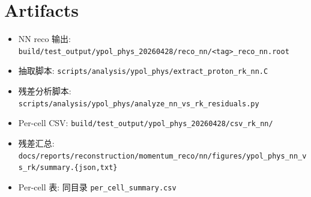 \documentclass[a4paper,11pt]{article}
\begin{document}
\section*{Artifacts}
\begin{itemize}[nosep]
    \item NN reco 输出: \texttt{build/test\_output/ypol\_phys\_20260428/reco\_nn/<tag>\_reco\_nn.root}
    \item 抽取脚本: \texttt{scripts/analysis/ypol\_phys/extract\_proton\_rk\_nn.C}
    \item 残差分析脚本: \texttt{scripts/analysis/ypol\_phys/analyze\_nn\_vs\_rk\_residuals.py}
    \item Per-cell CSV: \texttt{build/test\_output/ypol\_phys\_20260428/csv\_rk\_nn/}
    \item 残差汇总: \texttt{docs/reports/reconstruction/momentum\_reco/nn/figures/ypol\_phys\_nn\_vs\_rk/summary.\{json,txt\}}
    \item Per-cell 表: 同目录 \texttt{per\_cell\_summary.csv}
\end{itemize}
\end{document}
